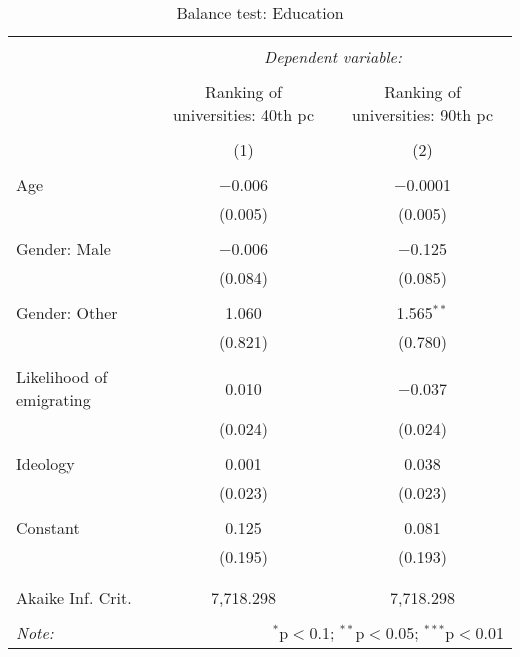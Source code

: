 \documentclass[12pt]{article}
\begin{document}
\begin{appendices}
\begin{table}[!htbp] \centering 
  \caption{Balance test: Education} 
  \label{tab:balance4} 
\begin{tabular}{@{\extracolsep{5pt}}lcc} 
\\[-1.8ex]\hline 
\hline \\[-1.8ex] 
 & \multicolumn{2}{c}{\textit{Dependent variable:}} \\ 
\cline{2-3} 
\\[-1.8ex] & Ranking of universities: 40th pc & Ranking of universities: 90th pc \\ 
\\[-1.8ex] & (1) & (2)\\ 
\hline \\[-1.8ex] 
  Age & $-$0.006 & $-$0.0001 \\ 
  & (0.005) & (0.005) \\ 
  & & \\ 
 Gender: Male & $-$0.006 & $-$0.125 \\ 
  & (0.084) & (0.085) \\ 
  & & \\ 
 Gender: Other & 1.060 & 1.565$^{**}$ \\ 
  & (0.821) & (0.780) \\ 
  & & \\ 
 Likelihood of emigrating & 0.010 & $-$0.037 \\ 
  & (0.024) & (0.024) \\ 
  & & \\ 
 Ideology & 0.001 & 0.038 \\ 
  & (0.023) & (0.023) \\ 
  & & \\ 
 Constant & 0.125 & 0.081 \\ 
  & (0.195) & (0.193) \\ 
  & & \\ 
\hline \\[-1.8ex] 
Akaike Inf. Crit. & 7,718.298 & 7,718.298 \\ 
\hline 
\hline \\[-1.8ex] 
\textit{Note:}  & \multicolumn{2}{r}{$^{*}$p$<$0.1; $^{**}$p$<$0.05; $^{***}$p$<$0.01} \\ 
\end{tabular} 
\end{table} 


\end{appendices}
\end{document}
